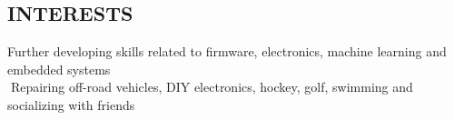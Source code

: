 \documentclass[mm]{res}
\begin{document}
\begin{resume}


\toprule
\section{\faMotorcycle \xspace INTERESTS \xspace}
\tb Further developing skills related to firmware, electronics, machine learning and embedded systems\\
􏰚\tb Repairing off-road vehicles, DIY electronics, hockey, golf, swimming and socializing with friends

\end{resume}
\end{document}
